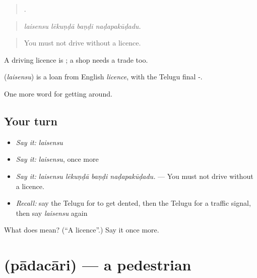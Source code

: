 \begin{quote}
   .
\end{quote}

\begin{quote}
\emph{laisensu lēkuṇḍā baṇḍi naḍapakūḍadu.}
\end{quote}

\begin{quote}
You must not drive without a licence.
\end{quote}

A driving licence is  ; a shop needs a trade  too.

\begin{cousinweb}
\textbf{} (\emph{laisensu}) is a loan from English \emph{licence}, with the Telugu final -.
\end{cousinweb}

\begin{grammarlens}[title={What you've built}]
One more word for getting around.
\end{grammarlens}

\subsection*{Your turn}
\begin{itemize}
\raggedright
  \item \emph{Say it:} \emph{laisensu}
  \item \emph{Say it:} \emph{laisensu}, once more
  \item \emph{Say it:} \emph{laisensu lēkuṇḍā baṇḍi naḍapakūḍadu.} — You must not drive without a licence.
  \item \emph{Recall:} say the Telugu for to get dented, then the Telugu for a traffic signal, then say \emph{laisensu} again
\end{itemize}

\begin{tcolorbox}[breakable,colback=teal!4,colframe=teal!35!black,title={Before you move on}]
What does  mean? (\textquotedblleft{}A licence\textquotedblright{}.) Say it once more.
\end{tcolorbox}
\section[\texorpdfstring{\te{పాదచారి} (pādacāri)}{పాదచారి (pādacāri)}]{ (pādacāri) — a pedestrian}

